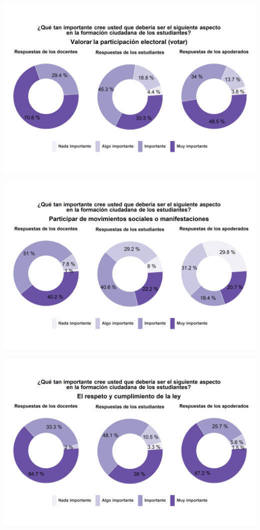 \documentclass[
  14pt,
]{book}
\begin{document}
\begin{center}\includegraphics[width=52.49in]{images/graph_for_ciud3} \end{center}

\begin{center}\includegraphics[width=52.49in]{images/graph_for_ciud4} \end{center}

\begin{center}\includegraphics[width=52.49in]{images/graph_for_ciud5} \end{center}
\end{document}
